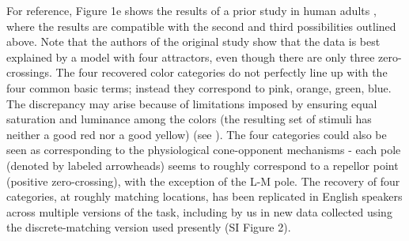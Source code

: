\documentclass[9pt,biorxiv,lineno,onehalfspacing]{lapreprint}
\begin{document}
\begin{refsection}
For reference, Figure 1e shows the results of a prior study in human adults \citep{bae_why_2015}, where the results are compatible with the second and third possibilities outlined above. 
Note that the authors of the original study show that the data is best explained by a model with four attractors, even though there are only three zero-crossings. 
The four recovered color categories do not perfectly line up with the four common basic terms; instead they correspond to pink, orange, green, blue.
The discrepancy may arise because of limitations imposed by ensuring equal saturation and luminance among the colors (the resulting set of stimuli has neither a good red nor a good yellow) (see \citep{bae_why_2015}). 
The four categories could also be seen as corresponding to the physiological cone-opponent mechanisms - each pole (denoted by labeled arrowheads) seems to roughly correspond to a repellor point (positive zero-crossing), with the exception of the L-M pole.
The recovery of four categories, at roughly matching locations, has been replicated in English speakers \citep{panichello_error-correcting_2019} across multiple versions of the task, including by us in new data collected using the discrete-matching version used presently (SI Figure 2). 


\end{refsection}
\end{document}
